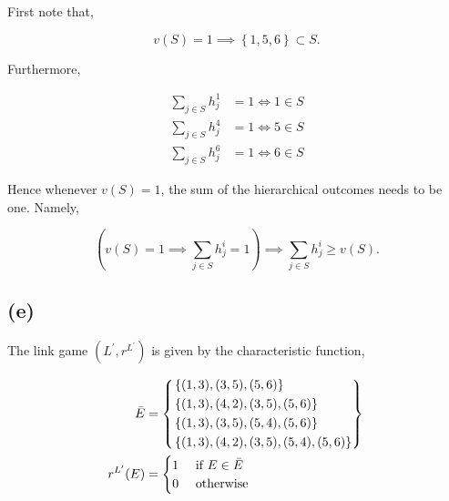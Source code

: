 \documentclass[american]{scrartcl}
\newcommand{\set}[1]{\left\{#1\right\}}
\begin{document}
First note that,

\begin{equation}
    v(S) = 1 \implies \set{1, 5, 6} \subset S.
\end{equation}

Furthermore,

\begin{equation}
    \begin{split}
        \sum_{j \in S} h_j^1 &= 1 \iff 1 \in S \\
        \sum_{j \in S} h_j^4 &= 1 \iff 5 \in S \\
        \sum_{j \in S} h_j^6 &= 1 \iff 6 \in S
    \end{split}
\end{equation}

Hence whenever $v(S) = 1$, the sum of the hierarchical outcomes needs to be one. Namely,

\begin{equation}
    \left(v(S) = 1 \implies \sum_{j \in S} h_j^i = 1\right) \implies \sum_{j \in S} h_j^i \geq v(S).
\end{equation}

\subsection*{(e)}

The link game $(L^\prime, r^{L^\prime})$ is given by the characteristic function,

\begin{equation} \label{value_r}
    \begin{split}
        \bar{E} &=
        \begin{dcases}
            \begin{rcases}
                \set{(1, 3), (3, 5), (5, 6)} \\
                \set{(1, 3), (4, 2), (3, 5), (5, 6)} \\
                \set{(1, 3), (3, 5), (5, 4), (5, 6)} \\
                \set{(1, 3), (4, 2), (3, 5), (5, 4), (5, 6)}
            \end{rcases}
        \end{dcases}\\
        r^{L^\prime}(E) &= \begin{cases}
            1 & \text{ if } E \in \bar{E} \\
            0 & \text{ otherwise }
        \end{cases}
    \end{split}
\end{equation}
\end{document}
